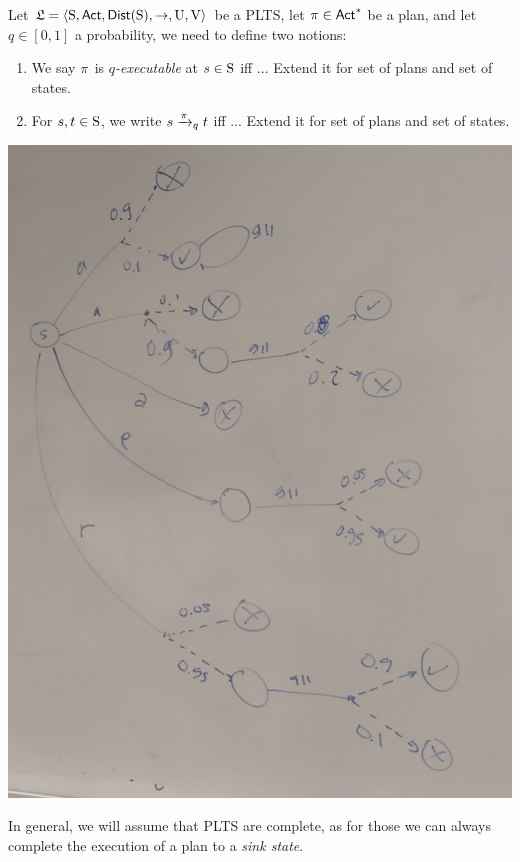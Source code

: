 \begin{definition} \label{def:executability} 
    Let  $\model=\tup{\S,\ACT,\dist(\S),\ra,\Unc,\V}$ be a PLTS, let $\plan\in\ACT^*$ be a plan, and let $q\in[0,1]$ a probability, we need to define two notions:
    \begin{enumerate}
        \item We say $\plan$ is \emph{$q$-executable} at $s\in\S$ iff ...  Extend it for set of plans and set of states.
        \item For $s,t\in\S$, we write $s \reach{\plan}_q t$ iff ... Extend it for set of plans and set of states.
    \end{enumerate}
\end{definition}

\begin{center}
\includegraphics[scale=0.1]{PLTS.jpg}
\end{center}


In general, we will assume that PLTS are complete, as for those we can always complete the execution of a plan to a \emph{sink state}.

